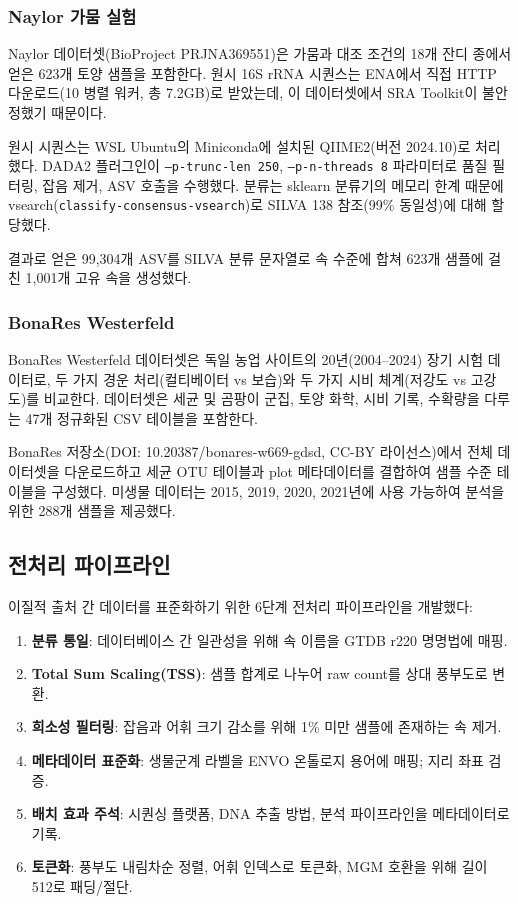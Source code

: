 \documentclass[11pt,a4paper]{article}
\begin{document}
\subsubsection{Naylor 가뭄 실험}

Naylor 데이터셋(BioProject PRJNA369551)은 가뭄과 대조 조건의 18개 잔디 종에서 얻은 623개 토양 샘플을 포함한다. 원시 16S rRNA 시퀀스는 ENA에서 직접 HTTP 다운로드(10 병렬 워커, 총 7.2GB)로 받았는데, 이 데이터셋에서 SRA Toolkit이 불안정했기 때문이다.

원시 시퀀스는 WSL Ubuntu의 Miniconda에 설치된 QIIME2(버전 2024.10)로 처리했다. DADA2 플러그인이 \texttt{--p-trunc-len 250}, \texttt{--p-n-threads 8} 파라미터로 품질 필터링, 잡음 제거, ASV 호출을 수행했다. 분류는 sklearn 분류기의 메모리 한계 때문에 vsearch(\texttt{classify-consensus-vsearch})로 SILVA 138 참조(99\% 동일성)에 대해 할당했다.

결과로 얻은 99,304개 ASV를 SILVA 분류 문자열로 속 수준에 합쳐 623개 샘플에 걸친 1,001개 고유 속을 생성했다.

\subsubsection{BonaRes Westerfeld}

BonaRes Westerfeld 데이터셋은 독일 농업 사이트의 20년(2004--2024) 장기 시험 데이터로, 두 가지 경운 처리(컬티베이터 vs 보습)와 두 가지 시비 체계(저강도 vs 고강도)를 비교한다. 데이터셋은 세균 및 곰팡이 군집, 토양 화학, 시비 기록, 수확량을 다루는 47개 정규화된 CSV 테이블을 포함한다.

BonaRes 저장소(DOI: 10.20387/bonares-w669-gdsd, CC-BY 라이선스)에서 전체 데이터셋을 다운로드하고 세균 OTU 테이블과 plot 메타데이터를 결합하여 샘플 수준 테이블을 구성했다. 미생물 데이터는 2015, 2019, 2020, 2021년에 사용 가능하여 분석을 위한 288개 샘플을 제공했다.

\subsection{전처리 파이프라인}

이질적 출처 간 데이터를 표준화하기 위한 6단계 전처리 파이프라인을 개발했다:

\begin{enumerate}[leftmargin=1.5em]
    \item \textbf{분류 통일}: 데이터베이스 간 일관성을 위해 속 이름을 GTDB r220 명명법에 매핑.
    \item \textbf{Total Sum Scaling(TSS)}: 샘플 합계로 나누어 raw count를 상대 풍부도로 변환.
    \item \textbf{희소성 필터링}: 잡음과 어휘 크기 감소를 위해 1\% 미만 샘플에 존재하는 속 제거.
    \item \textbf{메타데이터 표준화}: 생물군계 라벨을 ENVO 온톨로지 용어에 매핑; 지리 좌표 검증.
    \item \textbf{배치 효과 주석}: 시퀀싱 플랫폼, DNA 추출 방법, 분석 파이프라인을 메타데이터로 기록.
    \item \textbf{토큰화}: 풍부도 내림차순 정렬, 어휘 인덱스로 토큰화, MGM 호환을 위해 길이 512로 패딩/절단.
\end{enumerate}
\end{document}
